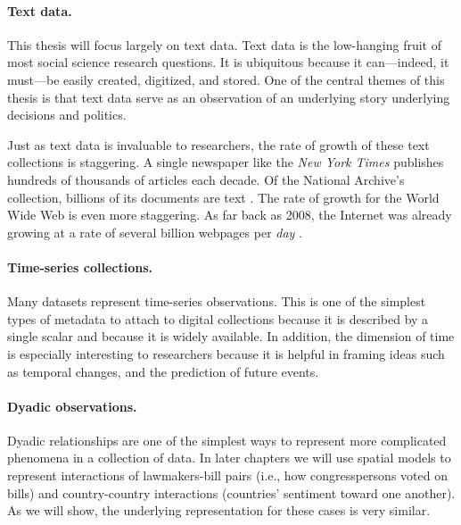 
\paragraph{Text data.} This thesis will focus largely on text data.
Text data is the low-hanging fruit of most social science research
questions.  It is ubiquitous because it can---indeed, it must---be
easily created, digitized, and stored. One of the central themes of
this thesis is that text data serve as an observation of an underlying
story underlying decisions and politics.

Just as text data is
invaluable to researchers, the rate of growth of these text
collections is staggering.  A single newspaper like the \emph{New York
  Times} publishes hundreds of thousands of articles each decade.  Of
the National Archive's collection, billions of its documents are text
\cite{national_archives:2012a,national_archives:2012b}.  The rate of
growth for the World Wide Web is even more staggering.  As far back as
2008, the Internet was already growing at a rate of several billion
webpages per \emph{day} \cite{googleblog:2008}.

\paragraph{Time-series collections.}  Many datasets represent
time-series observations.  This is one of the simplest types of
metadata to attach to digital collections because it is described by a
single scalar and because it is widely available.  In addition, the
dimension of time is especially interesting to researchers because it
is helpful in framing ideas such as temporal changes, and the
prediction of future events.

\paragraph{Dyadic observations.}  Dyadic relationships are one of the
simplest ways to represent more complicated phenomena in a collection
of data. In later chapters we will use spatial models to represent
interactions of lawmakers-bill pairs (i.e., how congresspersons voted
on bills) and country-country interactions (countries' sentiment
toward one another).  As we will show, the underlying representation
for these cases is very similar.

